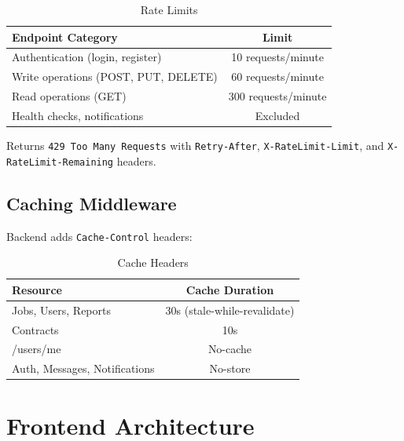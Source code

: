 \documentclass[12pt,a4paper]{article}
\begin{document}
\begin{table}[h]
\centering
\begin{tabular}{lc}
\toprule
\textbf{Endpoint Category} & \textbf{Limit} \\
\midrule
Authentication (login, register) & 10 requests/minute \\
Write operations (POST, PUT, DELETE) & 60 requests/minute \\
Read operations (GET) & 300 requests/minute \\
Health checks, notifications & Excluded \\
\bottomrule
\end{tabular}
\caption{Rate Limits}
\end{table}

Returns \texttt{429 Too Many Requests} with \texttt{Retry-After}, \texttt{X-RateLimit-Limit}, and \texttt{X-RateLimit-Remaining} headers.

\subsection{Caching Middleware}
Backend adds \texttt{Cache-Control} headers:

\begin{table}[h]
\centering
\begin{tabular}{lc}
\toprule
\textbf{Resource} & \textbf{Cache Duration} \\
\midrule
Jobs, Users, Reports & 30s (stale-while-revalidate) \\
Contracts & 10s \\
/users/me & No-cache \\
Auth, Messages, Notifications & No-store \\
\bottomrule
\end{tabular}
\caption{Cache Headers}
\end{table}

\section{Frontend Architecture}
\end{document}
